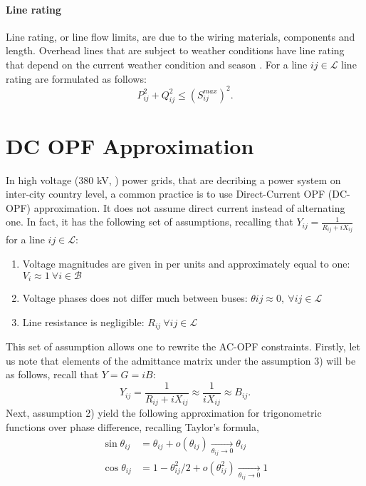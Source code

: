 \paragraph{Line rating}

Line rating, or line flow limits, are due to the wiring materials, components and length. Overhead lines that are subject to weather conditions have line rating that depend on the current weather condition and season \cite{fernandez2016review}. For a line $ij \in \mathcal{L}$ line rating are formulated as follows:
\begin{equation}
    P_{ij}^2 + Q_{ij}^2 \leq (S^{max}_{ij})^2.
    \label{eq:line_rating}
\end{equation}

\section{DC OPF Approximation}

In high voltage ($380$ kV, \cite{crucitti2005locating}) power grids, that are decribing a power system on inter-city country level, a common practice is to use Direct-Current OPF (DC-OPF) approximation. It does not assume direct current instead of alternating one. In fact, it has the following set of assumptions, recalling that $Y_{ij} = \frac{1}{R_{ij} + i X_{ij}}$ for a line $ij \in \mathcal{L}$:
\begin{enumerate}
    \item Voltage magnitudes are given in per units and approximately equal to one: $V_i \approx 1 ~ \forall i \in \mathcal{B}$
    \item Voltage phases does not differ much between buses: $\theta{ij} \approx 0, ~\forall ij \in \mathcal{L}$
    \item Line resistance is negligible: $R_{ij} ~ \forall ij \in \mathcal{L}$
\end{enumerate}

This set of assumption allows one to rewrite the AC-OPF constraints. Firstly, let us note that elements of the admittance matrix under the assumption 3) will be as follows, recall that $Y = G = i B$:
\begin{equation}
    Y_{ij} = \frac{1}{R_{ij} + i X_{ij}} \approx \frac{1}{iX_{ij}} \approx B_{ij}.
    \label{eq:admittance matrix approx}
\end{equation}
Next, assumption 2) yield the following approximation for trigonometric functions over phase difference, recalling Taylor's formula,%
\begin{equation}
    \begin{aligned}
        \sin \theta_{ij} &= \theta_{ij} + o(\theta_{ij}) \underset{\theta_{ij} \to 0}{\to} \theta_{ij}    \\
        \cos \theta_{ij} &= 1 - \theta^2_{ij} / 2 + o(\theta_{ij}^2) \underset{\theta_{ij} \to 0}{\to} 1    \\
    \end{aligned}
    \label{eq:phase diff approx}
\end{equation}

